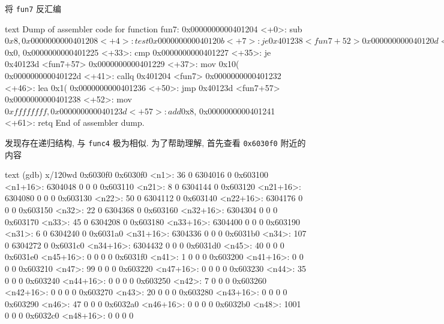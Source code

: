 将 \verb|fun7| 反汇编
\begin{code}{text}
Dump of assembler code for function fun7:
   0x0000000000401204 <+0>:     sub    $0x8,%
   0x0000000000401208 <+4>:     test   %
   0x000000000040120b <+7>:     je     0x401238 <fun7+52>
   0x000000000040120d <+9>:     mov    (%
   0x000000000040120f <+11>:    cmp    %
   0x0000000000401211 <+13>:    jle    0x401220 <fun7+28>
   0x0000000000401213 <+15>:    mov    0x8(%
   0x0000000000401217 <+19>:    callq  0x401204 <fun7>
   0x000000000040121c <+24>:    add    %
   0x000000000040121e <+26>:    jmp    0x40123d <fun7+57>
   0x0000000000401220 <+28>:    mov    $0x0,%
   0x0000000000401225 <+33>:    cmp    %
   0x0000000000401227 <+35>:    je     0x40123d <fun7+57>
   0x0000000000401229 <+37>:    mov    0x10(%
   0x000000000040122d <+41>:    callq  0x401204 <fun7>
   0x0000000000401232 <+46>:    lea    0x1(%
   0x0000000000401236 <+50>:    jmp    0x40123d <fun7+57>
   0x0000000000401238 <+52>:    mov    $0xffffffff,%
   0x000000000040123d <+57>:    add    $0x8,%
   0x0000000000401241 <+61>:    retq
End of assembler dump.
\end{code}
发现存在递归结构, 与 \verb|func4| 极为相似. 为了帮助理解, 首先查看 \verb|0x6030f0| 附近的内容
\begin{code}{text}
(gdb) x/120wd 0x6030f0
0x6030f0 <n1>:  36      0       6304016 0
0x603100 <n1+16>:       6304048 0       0       0
0x603110 <n21>: 8       0       6304144 0
0x603120 <n21+16>:      6304080 0       0       0
0x603130 <n22>: 50      0       6304112 0
0x603140 <n22+16>:      6304176 0       0       0
0x603150 <n32>: 22      0       6304368 0
0x603160 <n32+16>:      6304304 0       0       0
0x603170 <n33>: 45      0       6304208 0
0x603180 <n33+16>:      6304400 0       0       0
0x603190 <n31>: 6       0       6304240 0
0x6031a0 <n31+16>:      6304336 0       0       0
0x6031b0 <n34>: 107     0       6304272 0
0x6031c0 <n34+16>:      6304432 0       0       0
0x6031d0 <n45>: 40      0       0       0
0x6031e0 <n45+16>:      0       0       0       0
0x6031f0 <n41>: 1       0       0       0
0x603200 <n41+16>:      0       0       0       0
0x603210 <n47>: 99      0       0       0
0x603220 <n47+16>:      0       0       0       0
0x603230 <n44>: 35      0       0       0
0x603240 <n44+16>:      0       0       0       0
0x603250 <n42>: 7       0       0       0
0x603260 <n42+16>:      0       0       0       0
0x603270 <n43>: 20      0       0       0
0x603280 <n43+16>:      0       0       0       0
0x603290 <n46>: 47      0       0       0
0x6032a0 <n46+16>:      0       0       0       0
0x6032b0 <n48>: 1001    0       0       0
0x6032c0 <n48+16>:      0       0       0       0
\end{code} 

